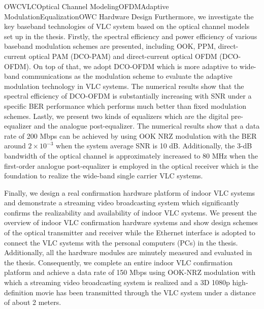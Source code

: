 \begin{englishabstract}{OWC\quad{}VLC\quad{}Optical Channel Modeling\quad{}OFDM\quad{}Adaptive Modulation\quad{}Equalization\quad{}OWC Hardware Design}
Furthermore, we investigate the key baseband technologies of VLC system based on the optical channel models set up in the thesis.
Firstly, the spectral efficiency and power efficiency of various baseband modulation schemes are presented, including OOK, PPM, direct-current optical PAM (DCO-PAM) and direct-current optical OFDM (DCO-OFDM).
On top of that, we adopt DCO-OFDM which is more adaptive to wide-band communications as the modulation scheme to evaluate the adaptive modulation technology in VLC systems.
The numerical results show that the spectral efficiency of DCO-OFDM is substantially increasing with SNR under a specific BER performance which performs much better than fixed modulation schemes.
Lastly, we present two kinds of equalizers which are the digital pre-equalizer and the analogue post-equalizer.
The numerical results show that a data rate of 200 Mbps can be achieved by using OOK NRZ modulation with the BER around $2\times10^{-3}$ when the system average SNR is 10 dB.
Additionally, the 3-dB bandwidth of the optical channel is approximately increased to 80 MHz when the first-order analogue post-equalizer is employed in the optical receiver which is the foundation to realize the wide-band single carrier VLC systems.

Finally, we design a real confirmation hardware platform of indoor VLC systems and demonstrate a streaming video broadcasting system which significantly confirms the realizability and availability of indoor VLC systems.
We present the overview of indoor VLC confirmation hardware systems and show design schemes of the optical transmitter and receiver while the Ethernet interface is adopted to connect the VLC systems with the personal computers (PCs) in the thesis.
Additionally, all the hardware modules are minutely measured and evaluated in the thesis.
Consequently, we complete an entire indoor VLC confirmation platform and achieve a data rate of 150 Mbps using OOK-NRZ modulation with which a streaming video broadcasting system is realized and a 3D 1080p high-definition movie has been transmitted through the VLC system under a distance of about 2 meters.

\end{englishabstract}

